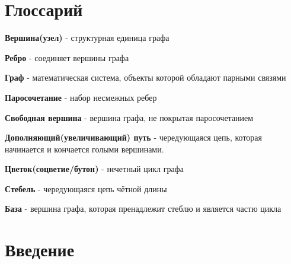 \documentclass[14pt, a4paper]{extarticle}
\begin{document}
    
    
    \vspace{1cm}
   
    \pagebreak
   
    \tableofcontents
   
    \pagebreak

    \section*{Глоссарий}

    \textbf{Вершина(узел)} - структурная единица графа

    \textbf{Ребро} - соединяет вершины графа
    
    \textbf{Граф} - математическая система, объекты которой обладают парными связями

    \textbf{Паросочетание} - набор несмежных ребер

    \textbf{Свободная вершина} - вершина графа, не покрытая паросочетанием

    \textbf{Дополняющий(увеличивающий) путь} - чередующаяся цепь, которая начинается и кончается голыми вершинами.

    \textbf{Цветок(соцветие/бутон)} - нечетный цикл графа

    \textbf{Стебель} - чередующаяся цепь чётной длины

    \textbf{База} - вершина графа, которая пренадлежит стеблю и  является частю цикла

    \pagebreak
   
    \section*{Введение}
   
   
   
\end{document}
